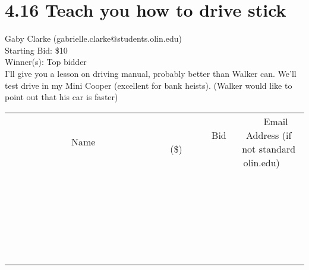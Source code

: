 \documentclass[11pt]{article}
\begin{document}
\section*{4.16 Teach you how to drive stick}
Gaby Clarke (gabrielle.clarke@students.olin.edu) \\
Starting Bid: \$10 \\
Winner(s): 
Top bidder \\
I'll give you a lesson on driving manual, probably better than Walker can. We'll test drive in my Mini Cooper (excellent for bank heists). (Walker would like to point out that his car is faster) \\[6ex]
\begin{tabular}{c c c}
~~~~~~~~~~~~~Name~~~~~~~~~~~~~ & ~~~~~~~~~Bid (\$)~~~~~~~~~ & ~~~Email Address (if not standard olin.edu)~~~ \\
 & & \\
\hline
 & & \\
\hline
 & & \\
\hline
 & & \\
\hline
 & & \\
\hline
 & & \\
\hline
 & & \\
\hline
 & & \\
\hline
 & & \\
\hline
 & & \\
\hline
 & & \\
\hline
 & & \\
\hline
 & & \\
\hline
 & & \\
\hline
 & & \\
\hline
 & & \\
\hline
 & & \\
\hline
 & & \\
\hline
 & & \\
\hline
 & & \\
\hline
 & & \\
\hline
 & & \\
\hline
 & & \\
\hline
 & & \\
\hline
 & & \\
\hline
 & & \\
\hline
\end{tabular}
\clearpage
\end{document}
